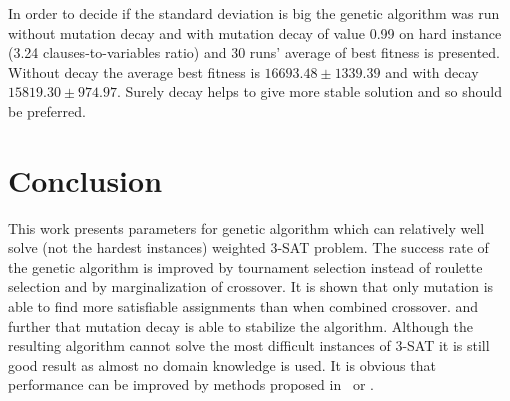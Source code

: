 \documentclass{article}
\begin{document}
In order to decide if the standard deviation is big the genetic algorithm
was run without mutation decay and with mutation decay of value 0.99 on
hard instance (3.24 clauses-to-variables ratio)
and 30 runs' average of best fitness is presented.
Without decay the average best fitness is $16693.48 \pm 1339.39$
and with decay $15819.30 \pm 974.97$.
Surely decay helps to give more stable solution and so should be preferred. 

\section{Conclusion}

This work presents parameters for genetic algorithm which can relatively
well solve (not the hardest instances) weighted 3-SAT problem.
The success rate of the genetic algorithm is improved
by tournament selection instead of roulette selection
and by marginalization of crossover.
It is shown that only mutation is able to find more satisfiable
assignments than when combined crossover.
and further that mutation decay is able to stabilize the algorithm.
Although the resulting algorithm cannot solve the most difficult
instances of 3-SAT it is still good result as almost no domain knowledge is
used.
It is obvious that performance can be improved by methods proposed
in~\cite{ellerweg2004} or \cite{gottlieb2002}.




\end{document}
